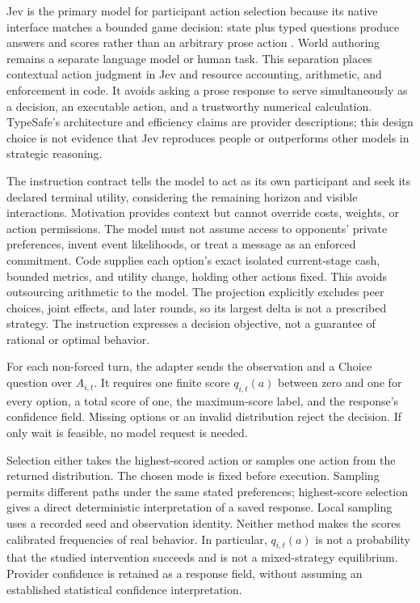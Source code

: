 Jev is the primary model for participant action selection because its native
interface matches a bounded game decision: state plus typed questions produce
answers and scores rather than an arbitrary prose action
\cite{typesafeintro,typesafeapi}. World authoring remains a separate language
model or human task. This separation places contextual action judgment in Jev
and resource accounting, arithmetic, and enforcement in code. It avoids asking
a prose response to serve simultaneously as a decision, an executable action,
and a trustworthy numerical calculation. TypeSafe's architecture and efficiency
claims are provider descriptions; this design choice is not evidence that Jev
reproduces people or outperforms other models in strategic reasoning.

The instruction contract tells the model to act as its own participant and
seek its declared terminal utility, considering the remaining horizon and
visible interactions. Motivation provides context but cannot override costs,
weights, or action permissions. The model must not assume access to opponents'
private preferences, invent event likelihoods, or treat a message as an enforced
commitment. Code supplies each option's exact isolated current-stage cash,
bounded metrics, and utility change, holding other actions fixed. This avoids
outsourcing arithmetic to the model. The projection explicitly excludes peer
choices, joint effects, and later rounds, so its largest delta is not a
prescribed strategy. The instruction expresses a decision objective, not a
guarantee of rational or optimal behavior.

For each non-forced turn, the adapter sends the observation
and a Choice question over $A_{i,t}$. It requires one finite score
$q_{i,t}(a)$ between zero and one for every option, a total score of one, the
maximum-score label, and the response's confidence field. Missing options or
an invalid distribution reject the decision. If only wait is feasible, no
model request is needed.

Selection either takes the highest-scored action or samples one action from
the returned distribution. The chosen mode is fixed before execution. Sampling
permits different paths under the same stated preferences; highest-score
selection gives a direct deterministic interpretation of a saved response.
Local sampling uses a recorded seed and observation identity. Neither method
makes the scores calibrated frequencies of real behavior. In particular,
$q_{i,t}(a)$ is not a probability that the studied intervention succeeds and is not a
mixed-strategy equilibrium. Provider confidence is retained as a response
field, without assuming an established statistical confidence interpretation.

